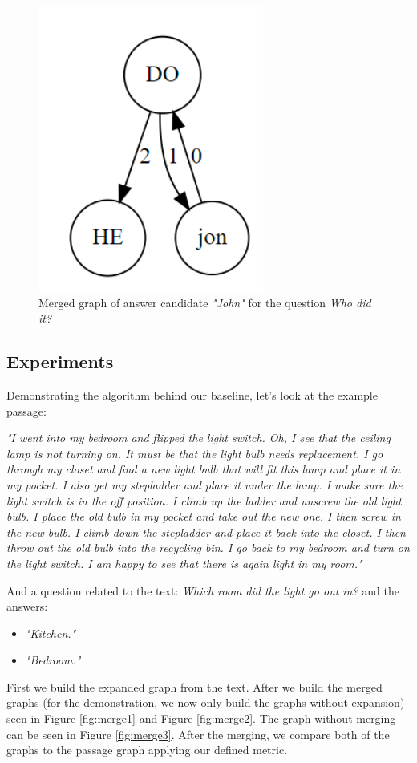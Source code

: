 \begin{figure}
	\centering
	\includegraphics[scale=0.3]{figures/merge}
	\caption{Merged graph of answer candidate \textit{"John"} for the
		question \textit{Who did it?}}
	\label{fig:merge}
\end{figure}

\subsection{Experiments}
\label{sec:exp}

Demonstrating the algorithm behind our baseline, let's look at the example passage:
\begin{center}
	\textit{ "I went into my bedroom and flipped the light switch. Oh, I see that the ceiling lamp is not turning on. It must be that the light bulb needs replacement. I go through my closet and find a new light bulb that will fit this lamp and place it in my pocket. I also get my stepladder and place it under the lamp. I make sure the light switch is in the off position. I climb up the ladder and unscrew the old light bulb. I place the old bulb in my pocket and take out the new one. I then screw in the new bulb. I climb down the stepladder and place it back into the closet. I then throw out the old bulb into the recycling bin. I go back to my bedroom and turn on the light switch. I am happy to see that there is again light in my room."}
\end{center}
And a question related to the text: \textit{Which room did the light go out in?} and the answers:
\begin{itemize}
	\item \textit{"Kitchen."}
	\item \textit{"Bedroom."}
\end{itemize}
First we build the expanded graph from the text. After we build the merged graphs (for the demonstration, we now only build the graphs without expansion) seen in Figure \ref{fig:merge1} and Figure \ref{fig:merge2}. The graph without merging can be seen in Figure \ref{fig:merge3}. After the merging, we compare both of the graphs to the passage graph applying our defined metric.

